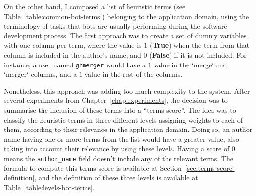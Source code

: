 \documentclass[a4paper, 12pt]{book}
\begin{document}
On the other hand, I composed a list of heuristic terms (see Table~\ref{table:common-bot-terms}) belonging to the application domain, using the terminology of tasks that bots are usually performing during the software development process.  The first approach was to create a set of dummy variables with one column per term, where the value is $1$ (\textbf{True}) when the term from that column is included in the author's name; and $0$ (\textbf{False}) if it is not included. For instance, a user named \texttt{ghmerger} would have a $1$ value in the `merge` and `merger` columns, and a $1$ value in the rest of the columns. 

Nonetheless, this approach was adding too much complexity to the system. After several experiments from Chapter~\ref{chap:experiments}, the decision was to summarise the inclusion of these terms into a ``terms score''. The idea was to classify the heuristic terms in three different levels assigning weights to each of them, according to their relevance in the application domain. Doing so, an author name having one or more terms from the list would have a greater value, also taking into account their relevance by using these levels. Having a score of $0$ means the \texttt{author\_name} field doesn't include any of the relevant terms. The formula to compute this terms score is available at Section~\ref{sec:terms-score-definition}, and the definition of these three levels is available at Table~\ref{table:levels-bot-terms}. 
\end{document}
